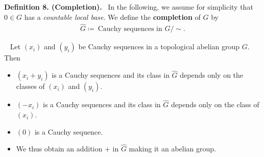 \documentclass[12pt,a4paper,footinclude=true,headinclude=true]{scrbook} %
\newenvironment{proposition}[2][]
{\renewcommand\theinnercustomprop{#2}\innercustomprop[#1] 
\begin{mdframed}[backgroundcolor=gray!20]\ }
{\end{mdframed}\endinnercustomprop}
\newenvironment{definition}[2][Definition]
    { \begin{mdframed}[backgroundcolor=gray!20] \textbf{#1 #2.}\ }
    {  \end{mdframed}}
\begin{document}
\begin{definition}{8. (Completion)}
    In the following, we assume for simplicity that $0\in G$ has a \textit{countable local base}. We define the \textbf{completion} of $G$ by 
        \begin{align*}
            \widehat{G}\coloneqq\ \text{Cauchy sequences in $G$}/\sim.
        \end{align*}
\end{definition}
\newpage
\begin{proposition}{9}
    Let $(x_i)$ and $(y_i)$ be Cauchy sequences in a topological abelian group $G$. Then
    \begin{itemize}
        \item[(a)] $(x_i+y_i)$ is a Cauchy sequences and its class in $\widehat{G}$ depends only on the classes of $(x_i)$ and $(y_i)$.
        \item[(b)] $(-x_i)$ is a Cauchy sequences and its class in $\widehat{G}$ depends only on the class of $(x_i)$.
        \item[(c)] $(0)$ is a Cauchy sequence.
        \item[(d)] We thus obtain an addition $+$ in $\widehat{G}$ making it an abelian group.
    \end{itemize}
\end{proposition}
\end{document}

